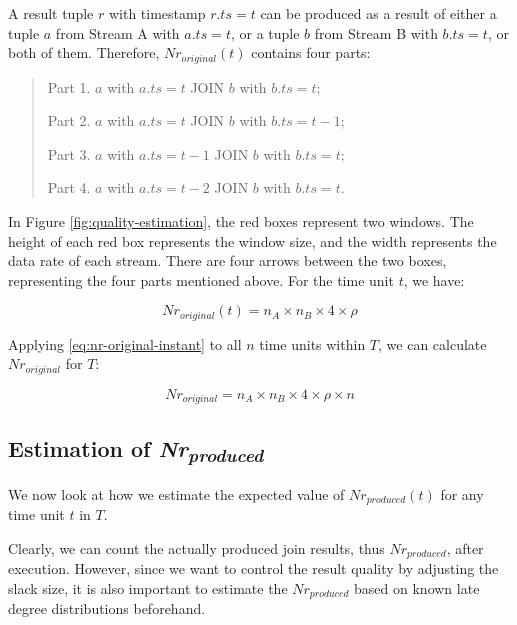 \documentclass[a4paper, 11pt, twoside]{report}
\begin{document}
A result tuple $r$ with timestamp $r.ts=t$ can be produced as a result of either a tuple $a$ from Stream A with $a.ts=t$, or a tuple $b$ from Stream B with $b.ts=t$, or both of them. Therefore, $Nr_{original}(t)$ contains four parts:

\begin{quote}
 Part 1. $a$ with $a.ts=t$ JOIN $b$ with $b.ts=t$;
 
 Part 2. $a$ with $a.ts=t$ JOIN $b$ with $b.ts=t-1$;
 
 Part 3. $a$ with $a.ts=t-1$ JOIN $b$ with $b.ts=t$;
 
 Part 4. $a$ with $a.ts=t-2$ JOIN $b$ with $b.ts=t$. \\
\end{quote}
 
In Figure \ref{fig:quality-estimation}, the red boxes represent two windows. The height of each red box represents the window size, and the width represents the data rate of each stream. There are four arrows between the two boxes, representing the four parts mentioned above. For the time unit $t$, we have:

\begin{equation}
\label{eq:nr-original-instant}
Nr_{original}(t)=n_{A}\times n_{B}\times 4 \times \rho
\end{equation}

Applying \ref{eq:nr-original-instant} to all $n$ time units within $T$, we can calculate $Nr_{original}$ for $T$:

\begin{equation}
\label{eq:nr-original}
Nr_{original}=n_{A}\times n_{B}\times 4 \times \rho \times n
\end{equation}

%

\subsection{Estimation of \textit{Nr\textsubscript{produced}}}

We now look at how we estimate the expected value of $Nr_{produced}(t)$ for any time unit $t$ in $T$.\\

%

Clearly, we can count the actually produced join results, thus $Nr_{produced}$, after execution. However, since we want to control the result quality by adjusting the slack size, it is also important to estimate the $Nr_{produced}$ based on known late degree distributions beforehand.\\
\end{document}
